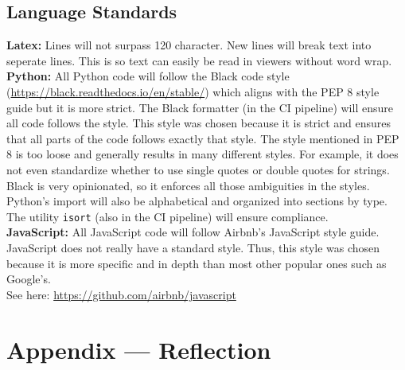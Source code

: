 \documentclass{article}
\begin{document}
\subsection{Language Standards}
\textbf{Latex:} Lines will not surpass 120 character. New lines will break text into 
seperate lines. This is so text can easily be read in viewers without word wrap.\\
\textbf{Python:} All Python code will follow the Black code style \\
(\url{https://black.readthedocs.io/en/stable/}) which aligns with the PEP 8 style guide but it is
more strict. The Black formatter (in the CI pipeline) will ensure all code follows the style. This
style was chosen because it is strict and ensures that all parts of the code follows exactly that
style. The style mentioned in PEP 8 is too loose and generally results in many different styles. 
For example, it does not even standardize whether to use single quotes or double quotes for 
strings. Black is very opinionated, so it enforces all those ambiguities in the styles.
Python's import will also be alphabetical and organized into sections by type. The utility 
\verb|isort| (also in the CI pipeline) will ensure compliance.\\
\textbf{JavaScript:} All JavaScript code will follow Airbnb's JavaScript style guide. JavaScript 
does not really have a standard style. Thus, this style was chosen because it is more specific and
in depth than most other popular ones such as Google's.\\
See here: \url{https://github.com/airbnb/javascript}\\


\newpage{}

\section*{Appendix --- Reflection}


\end{document}

